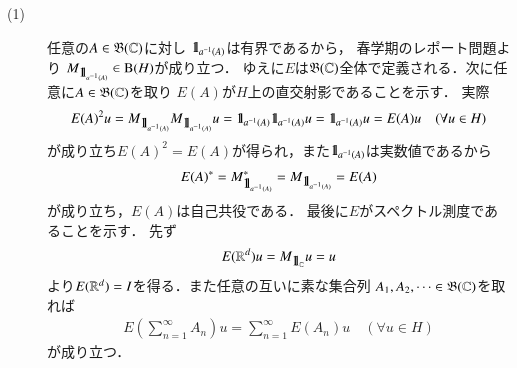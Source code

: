 	\begin{prf}\mbox{}
		\begin{description}
			\item[(1)] 
				任意の$A \in \mathfrak{B}(\mathbb{C})$に対し
				$\mbox{1}\hspace{-0.25em}\mbox{l}_{a^{-1}(A)}$は有界であるから，
				春学期のレポート問題より
				$M_{\mbox{1}\hspace{-0.25em}\mbox{l}_{a^{-1}(A)}} \in \mathrm{B}(H) $が成り立つ．
				ゆえに$E$は$\mathfrak{B}(\mathbb{C})$全体で定義される．次に任意に$A \in \mathfrak{B}(\mathbb{C})$を取り
				$E(A)$が$H$上の直交射影であることを示す．
				実際
				\begin{align}
					E(A)^2 u = M_{\mbox{1}\hspace{-0.25em}\mbox{l}_{a^{-1}(A)}}M_{\mbox{1}\hspace{-0.25em}\mbox{l}_{a^{-1}(A)}}u
					= \mbox{1}\hspace{-0.25em}\mbox{l}_{a^{-1}(A)}\mbox{1}\hspace{-0.25em}\mbox{l}_{a^{-1}(A)}u
					= \mbox{1}\hspace{-0.25em}\mbox{l}_{a^{-1}(A)}u
					= E(A) u
					\quad (\forall u \in H)
				\end{align}
				が成り立ち$E(A)^2 = E(A)$が得られ，また$\mbox{1}\hspace{-0.25em}\mbox{l}_{a^{-1}(A)}$は実数値であるから
				\begin{align}
					E(A)^* = M_{\mbox{1}\hspace{-0.25em}\mbox{l}_{a^{-1}(A)}}^* = M_{\mbox{1}\hspace{-0.25em}\mbox{l}_{a^{-1}(A)}} = E(A)
				\end{align}
				が成り立ち，$E(A)$は自己共役である．
				最後に$E$がスペクトル測度であることを示す．
				先ず
				\begin{align}
					E(\mathbb{R}^d)u = M_{\mbox{1}\hspace{-0.25em}\mbox{l}_{\mathbb{C}}}u = u
				\end{align}
				より$E(\mathbb{R}^d) = I$を得る．また任意の互いに素な集合列
				$A_1,A_2,\cdots \in \mathfrak{B}(\mathbb{C})$を取れば
				\begin{align}
					E(\sum_{n=1}^{\infty}A_n)u
					= \sum_{n=1}^{\infty} E(A_n) u
					\quad (\forall u \in H)
				\end{align}
				が成り立つ．
				

\end{description}
\end{prf}
